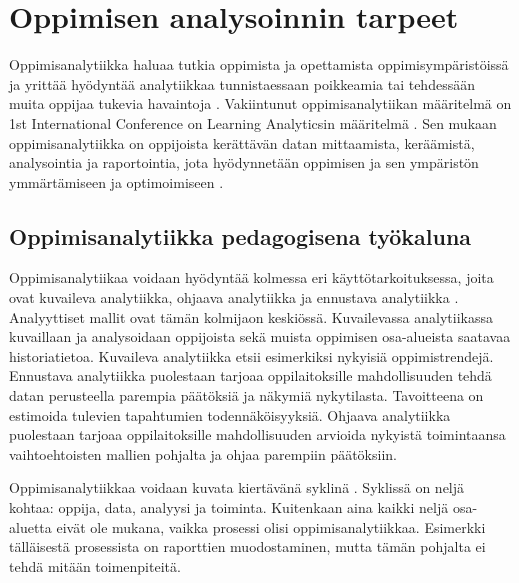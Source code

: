 \chapter{Oppimisen analysoinnin tarpeet\label{oppimisenanalysoinnintarpeet}}

Oppimisanalytiikka haluaa tutkia oppimista ja opettamista oppimisympäristöissä ja yrittää hyödyntää analytiikkaa tunnistaessaan poikkeamia tai tehdessään muita oppijaa tukevia havaintoja \citep{longPenetratingFogAnalytics2011}. Vakiintunut oppimisanalytiikan määritelmä on 1st International Conference on Learning Analyticsin määritelmä \citep{siemensLearningAnalyticsEmergence2013}. Sen mukaan oppimisanalytiikka on oppijoista kerättävän datan mittaamista, keräämistä, analysointia ja raportointia, jota hyödynnetään oppimisen ja sen ympäristön ymmärtämiseen ja optimoimiseen \citep{clowLearningAnalyticsCycle2012}.


\section{Oppimisanalytiikka pedagogisena työkaluna}

Oppimisanalytiikaa voidaan hyödyntää kolmessa eri käyttötarkoituksessa, joita ovat kuvaileva analytiikka, ohjaava analytiikka ja ennustava analytiikka \citep{auvinenOppimisanalytiikkaTuleeOletko2017, danielBigDataAnalytics2015}. Analyyttiset mallit ovat tämän kolmijaon keskiössä. Kuvailevassa analytiikassa kuvaillaan ja analysoidaan oppijoista sekä muista oppimisen osa-alueista saatavaa historiatietoa. Kuvaileva analytiikka etsii esimerkiksi nykyisiä oppimistrendejä. Ennustava analytiikka puolestaan tarjoaa oppilaitoksille mahdollisuuden tehdä datan perusteella parempia päätöksiä ja näkymiä nykytilasta. Tavoitteena on estimoida tulevien tapahtumien todennäköisyyksiä. Ohjaava analytiikka puolestaan tarjoaa oppilaitoksille mahdollisuuden arvioida nykyistä toimintaansa vaihtoehtoisten mallien pohjalta ja ohjaa parempiin päätöksiin.

Oppimisanalytiikkaa voidaan kuvata kiertävänä syklinä \citep{clowLearningAnalyticsCycle2012}. Syklissä on neljä kohtaa: oppija, data, analyysi ja toiminta. Kuitenkaan aina kaikki neljä osa-aluetta eivät ole mukana, vaikka prosessi olisi oppimisanalytiikkaa. Esimerkki tälläisestä prosessista on raporttien muodostaminen, mutta tämän pohjalta ei tehdä mitään toimenpiteitä.

